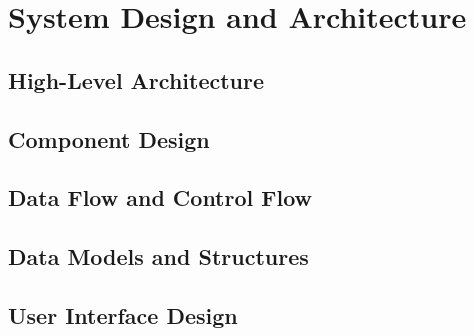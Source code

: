   \section{System Design and Architecture}
  \label{sec:system-design}

  \subsection{High-Level Architecture}
  \label{subsec:high-level-architecture}

  \subsection{Component Design}
  \label{subsec:component-design}

  \subsection{Data Flow and Control Flow}
  \label{subsec:data-flow}

  \subsection{Data Models and Structures}
  \label{subsec:data-models}

  \subsection{User Interface Design}
  \label{subsec:user-interface-design}